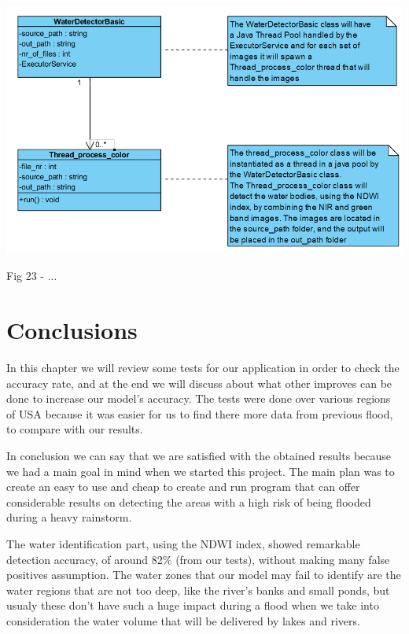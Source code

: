 \documentclass[12pt, a4paper]{report}
\begin{document}
\medskip
\includegraphics[scale=0.7, center]{WaterDetectorBasic_class.png}
\begin{center}
Fig 23 - ... 
\end{center}
\par 

\newpage



\newpage{}

\chapter{Conclusions}

\quad 

In this chapter we will review some tests for our application in order to check the accuracy rate, and at the end we will discuss about what other improves can be done to increase our model's accuracy. The tests were done over various regions of USA because it was easier for us to find there more data from previous flood, to compare with our results.
\par 

In conclusion we can say that we are satisfied with the obtained results because we had a main goal in mind when we started this project. The main plan was to create an easy to use and cheap to create and run program that can offer considerable results on detecting the areas with a high risk of being flooded during a heavy rainstorm.
\par 

The water identification part, using the NDWI index, showed remarkable detection accuracy, of around 82\% (from our tests), without making many false positives assumption. The water zones that our model may fail to identify are the water regions that are not too deep, like the river's banks and small ponds, but usualy these don't have such a huge impact during a flood when we take into consideration the water volume that will be delivered by lakes and rivers.
\par 
\end{document}
